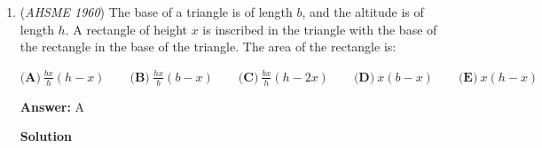 \begin{enumerate}
 $\textbf{(A)}\ a\text{ }\text{and}\text{ }d\qquad \textbf{(B)}\ d\text{ }\text{and}\text{ }n\qquad \textbf{(C)}\ a\text{ }\text{and}\text{ }n\qquad \textbf{(D)}\ a, d,\text{ }\text{and}\text{ }n\qquad  \textbf{(E)}\ \text{neither} \text{ } a \text{ } \text{nor} \text{ } d \text{ } \text{nor} \text{ } n$

 \textbf{Answer: }B



\textbf{Solution}

The nth term of the sequence with first term $a$ is $a + d(n-1)$.  That means the sum of the first $n$ terms is with first term $a$ is $\frac{n(2a + dn -d)}{2}$.

 The 2nth term of the sequence with first term $a$ is $a + d(2n-1)$.  That means the sum of the first $2n$ terms is with first term $a$ is $\frac{2n(2a + 2dn -d)}{2}$.

 The 3nth term of the sequence with first term $a$ is $a + d(3n-1)$.  That means the sum of the first $3n$ terms is with first term $a$ is $\frac{3n(2a + 3dn -d)}{2}$.

 Substituting $s_1$, $s_2$, and $s_3$ with its respective values results in

 
 \[\frac{3n(2a + 3dn -d)}{2}-\frac{2n(2a + 2dn -d)}{2}-\frac{n(2a + dn -d)}{2}\]
 \[\frac{6an + 9dn^2 -3nd}{2}-\frac{4an + 4dn^2 - 2nd}{2}-\frac{2an + dn^2 - dn}{2}\]

 \[\frac{4dn^2}{2}\]

 \[2dn^2\]

 The answer is $\boxed{\textbf{(B)}}$.

 


 MathProblemSolvingSkills.com

 


 


	\item (\textit{AHSME 1960}) The base of a triangle is of length $b$, and the altitude is of length $h$. 
A rectangle of height $x$ is inscribed in the triangle with the base of the rectangle in the base of the triangle. The area of the rectangle is:


 $\textbf{(A)}\ \frac{bx}{h}(h-x)\qquad \textbf{(B)}\ \frac{hx}{b}(b-x)\qquad \textbf{(C)}\ \frac{bx}{h}(h-2x)\qquad \textbf{(D)}\ x(b-x)\qquad \textbf{(E)}\ x(h-x)$

 \textbf{Answer: }A



\textbf{Solution}


\end{enumerate}
